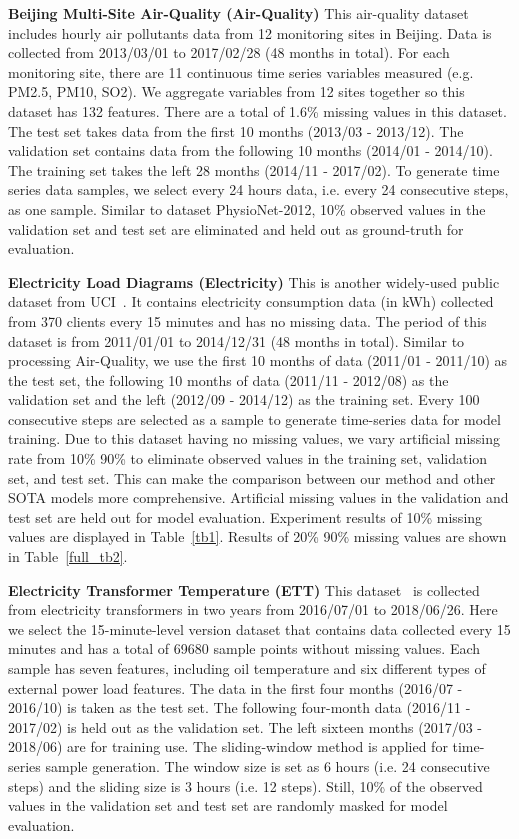 \documentclass{article}
\begin{document}
\textbf{Beijing Multi-Site Air-Quality (Air-Quality)}\hspace{1em} 
This air-quality dataset~\cite{Zhang2017AirQuality} includes hourly air pollutants data from 12 monitoring sites in Beijing. Data is collected from 2013/03/01 to 2017/02/28 (48 months in total). For each monitoring site, there are 11 continuous time series variables measured (e.g. PM2.5, PM10, SO2). We aggregate variables from 12 sites together so this dataset has 132 features. There are a total of 1.6\% missing values in this dataset. The test set takes data from the first 10 months (2013/03 - 2013/12). The validation set contains data from the following 10 months (2014/01 - 2014/10). The training set takes the left 28 months (2014/11 - 2017/02). To generate time series data samples, we select every 24 hours data, i.e. every 24 consecutive steps, as one sample. Similar to dataset PhysioNet-2012, 10\% observed values in the validation set and test set are eliminated and held out as ground-truth for evaluation.

\textbf{Electricity Load Diagrams (Electricity)} \hspace{1em} 
This is another widely-used public dataset from UCI~\cite{Dua2017UCI}. It contains electricity consumption data (in kWh) collected from 370 clients every 15 minutes and has no missing data. The period of this dataset is from 2011/01/01 to 2014/12/31 (48 months in total). Similar to processing Air-Quality, we use the first 10 months of data (2011/01 - 2011/10) as the test set, the following 10 months of data (2011/11 - 2012/08) as the validation set and the left (2012/09 - 2014/12) as the training set. Every 100 consecutive steps are selected as a sample to generate time-series data for model training. Due to this dataset having no missing values, we vary artificial missing rate from 10\%  90\% to eliminate observed values in the training set, validation set, and test set. This can make the comparison between our method and other SOTA models more comprehensive. Artificial missing values in the validation and test set are held out for model evaluation. Experiment results of 10\% missing values are displayed in Table~\ref{tb1}. Results of 20\%  90\% missing values are shown in Table~\ref{full_tb2}.

\textbf{Electricity Transformer Temperature (ETT)} \hspace{1em}
This dataset~\cite{Zhou2021informer} is collected from electricity transformers in two years from 2016/07/01 to 2018/06/26. Here we select the 15-minute-level version dataset that contains data collected every 15 minutes and has a total of 69680 sample points without missing values. Each sample has seven features, including oil temperature and six different types of external power load features. The data in the first four months (2016/07 - 2016/10) is taken as the test set. The following four-month data (2016/11 - 2017/02) is held out as the validation set. The left sixteen months (2017/03 - 2018/06) are for training use. The sliding-window method is applied for time-series sample generation. The window size is set as 6 hours (i.e. 24 consecutive steps) and the sliding size is 3 hours (i.e. 12 steps). Still, 10\% of the observed values in the validation set and test set are randomly masked for model evaluation.
\end{document}
